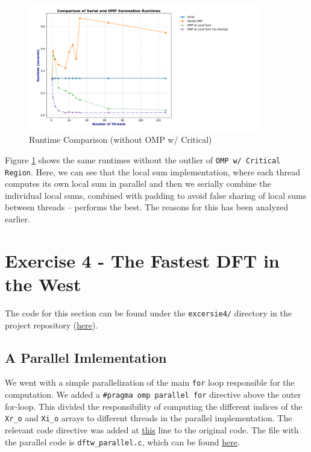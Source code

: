 \documentclass[a4paper,10pt]{article}
\begin{document}
\begin{figure}[H]
  \centering
  \includegraphics[width=0.9\textwidth]{img/ex3/ex3_comparison_no_critical.png}
  \caption{Runtime Comparison (without OMP w/ Critical)}
  \label{fig:ex3_runtime_no_critical}
\end{figure}

Figure \ref{fig:ex3_runtime_no_critical} shows the same runtimes without the outlier of \verb|OMP w/ Critical Region|. Here, we can see that the local sum implementation, where each thread computes its own local sum in parallel and then we serially combine the individual local sums, combined with padding to avoid false sharing of local sums between threads -- performs the best. The reasons for this has been analyzed earlier. 

\section{Exercise 4 - The Fastest DFT in the West}
The code for this section can be found under the \verb|excersie4/| directory in the project repository (\href{https://github.com/paulmyr/DD2356-MethodsHPC/tree/master/3_open_mp/exercise4}{here}). 

\subsection{A Parallel Imlementation}
We went with a simple parallelization of the main \verb|for| loop responsible for the computation. We added a \verb|#pragma omp parallel for| directive above the outer for-loop. This divided the responsibility of computing the different indices of the \verb|Xr_o| and \verb|Xi_o| arrays to different threads in the parallel implementation. The relevant code directive was added at \href{https://github.com/paulmyr/DD2356-MethodsHPC/blob/master/3_open_mp/exercise4/dftw_parallel.c#L88}{this} line to the original code. The file with the parallel code is \verb|dftw_parallel.c|, which can be found \href{https://github.com/paulmyr/DD2356-MethodsHPC/blob/master/3_open_mp/exercise4/dftw_parallel.c}{here}.
\end{document}
